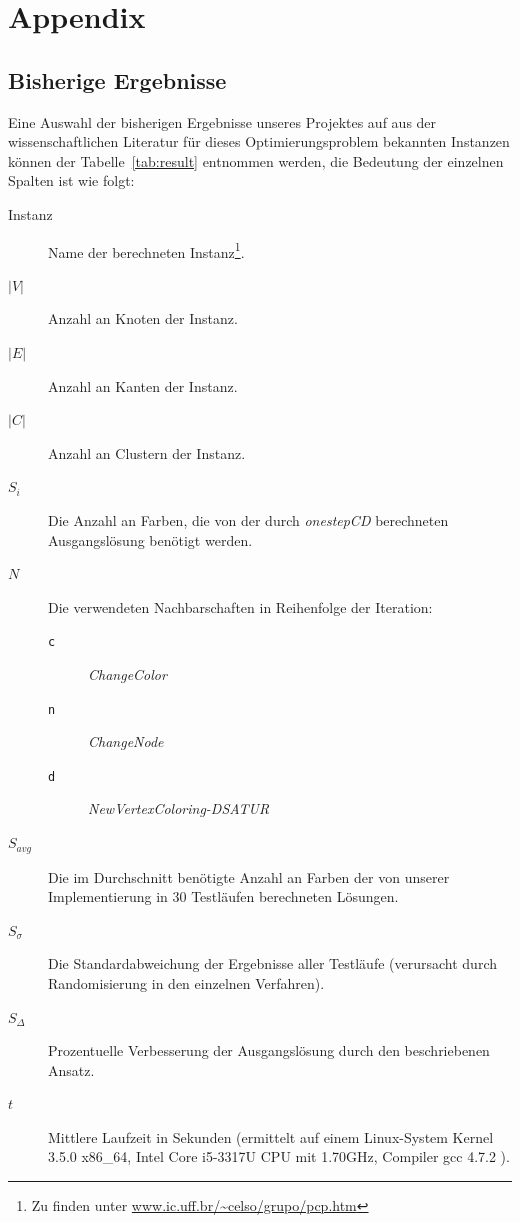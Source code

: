 \documentclass[paper=a4,fontsize=12pt]{scrartcl}
\let\origappendix\appendix
\renewcommand\appendix{\clearpage\pagenumbering{roman}\origappendix}
\begin{document}

\appendix

\section{Appendix}

\subsection{Bisherige Ergebnisse}

Eine Auswahl der bisherigen Ergebnisse unseres Projektes auf aus der wissenschaftlichen Literatur für dieses Optimierungsproblem bekannten Instanzen können der Tabelle~\ref{tab:result} entnommen werden, die Bedeutung der einzelnen Spalten ist wie folgt:

\begin{description}
    \item[Instanz] Name der berechneten Instanz\footnote{Zu finden unter \url{www.ic.uff.br/~celso/grupo/pcp.htm}}.%
    \item[$|V|$] Anzahl an Knoten der Instanz.
    \item[$|E|$] Anzahl an Kanten der Instanz.
    \item[$|C|$] Anzahl an Clustern der Instanz.
    \item[$S_i$] Die Anzahl an Farben, die von der durch \emph{onestepCD} berechneten Ausgangslösung benötigt werden.
    \item[$N$] Die verwendeten Nachbarschaften in Reihenfolge der Iteration:
        \begin{description}
            \item[\texttt{c}] \emph{ChangeColor}
            \item[\texttt{n}] \emph{ChangeNode}
            \item[\texttt{d}] \emph{NewVertexColoring-DSATUR}
        \end{description}
    \item[$S_{avg}$] Die im Durchschnitt benötigte Anzahl an Farben der von unserer Implementierung in 30 Testläufen berechneten Lösungen.
    \item[$S_{\sigma}$] Die Standardabweichung der Ergebnisse aller Testläufe (verursacht durch Ran\-dom\-isier\-ung in den einzelnen Verfahren).
    \item[$S_{\Delta}$] Prozentuelle Verbesserung der Ausgangslösung durch den beschriebenen Ansatz.
    \item[$t$] Mittlere Laufzeit in Sekunden (ermittelt auf einem Linux-System Kernel 3.5.0 x86\_64, Intel Core i5-3317U CPU mit 1.70GHz, Compiler gcc 4.7.2 ).
\end{description}
\end{document}
